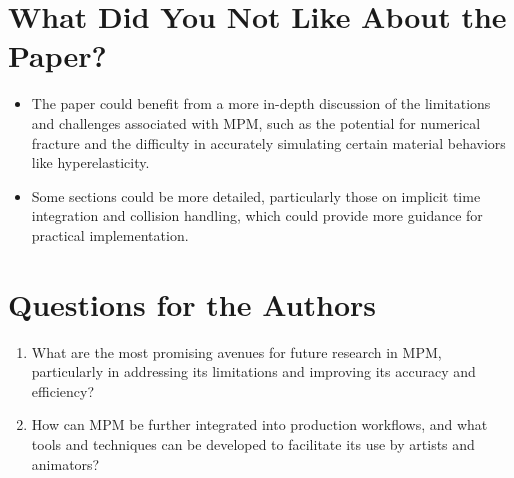 \documentclass[12pt]{article}
\begin{document}
\section{What Did You Not Like About the Paper?}
\begin{itemize}[noitemsep]
    \item The paper could benefit from a more in-depth discussion of the limitations and challenges associated with MPM, such as the potential for numerical fracture and the difficulty in accurately simulating certain material behaviors like hyperelasticity.
    \item Some sections could be more detailed, particularly those on implicit time integration and collision handling, which could provide more guidance for practical implementation.
\end{itemize}

\section{Questions for the Authors}
\begin{enumerate}[noitemsep]
    \item What are the most promising avenues for future research in MPM, particularly in addressing its limitations and improving its accuracy and efficiency?
    \item How can MPM be further integrated into production workflows, and what tools and techniques can be developed to facilitate its use by artists and animators?
\end{enumerate}
\end{document}

